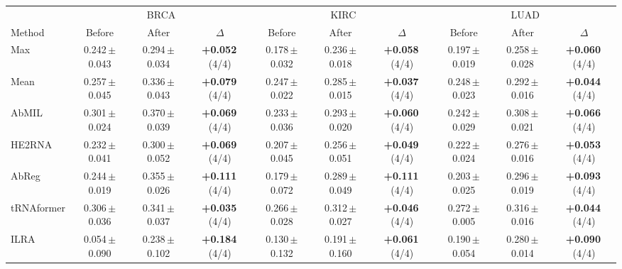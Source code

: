 \begin{tabular}{lccccccccc}
\toprule
& \multicolumn{3}{c}{BRCA} & \multicolumn{3}{c}{KIRC} & \multicolumn{3}{c}{LUAD}\\
\cmidrule(lr){2-4}\cmidrule(lr){5-7}\cmidrule(lr){8-10}
Method & Before & After & $\Delta$ & Before & After & $\Delta$ & Before & After & $\Delta$\\
\midrule
Max & 0.242\,{\tiny$\pm$0.043} & 0.294\,{\tiny$\pm$0.034} & \textbf{+0.052}\,{\tiny(4/4)} & 0.178\,{\tiny$\pm$0.032} & 0.236\,{\tiny$\pm$0.018} & \textbf{+0.058}\,{\tiny(4/4)} & 0.197\,{\tiny$\pm$0.019} & 0.258\,{\tiny$\pm$0.028} & \textbf{+0.060}\,{\tiny(4/4)}\\
Mean & 0.257\,{\tiny$\pm$0.045} & 0.336\,{\tiny$\pm$0.043} & \textbf{+0.079}\,{\tiny(4/4)} & 0.247\,{\tiny$\pm$0.022} & 0.285\,{\tiny$\pm$0.015} & \textbf{+0.037}\,{\tiny(4/4)} & 0.248\,{\tiny$\pm$0.023} & 0.292\,{\tiny$\pm$0.016} & \textbf{+0.044}\,{\tiny(4/4)}\\
AbMIL & 0.301\,{\tiny$\pm$0.024} & 0.370\,{\tiny$\pm$0.039} & \textbf{+0.069}\,{\tiny(4/4)} & 0.233\,{\tiny$\pm$0.036} & 0.293\,{\tiny$\pm$0.020} & \textbf{+0.060}\,{\tiny(4/4)} & 0.242\,{\tiny$\pm$0.029} & 0.308\,{\tiny$\pm$0.021} & \textbf{+0.066}\,{\tiny(4/4)}\\
HE2RNA & 0.232\,{\tiny$\pm$0.041} & 0.300\,{\tiny$\pm$0.052} & \textbf{+0.069}\,{\tiny(4/4)} & 0.207\,{\tiny$\pm$0.045} & 0.256\,{\tiny$\pm$0.051} & \textbf{+0.049}\,{\tiny(4/4)} & 0.222\,{\tiny$\pm$0.024} & 0.276\,{\tiny$\pm$0.016} & \textbf{+0.053}\,{\tiny(4/4)}\\
AbReg & 0.244\,{\tiny$\pm$0.019} & 0.355\,{\tiny$\pm$0.026} & \textbf{+0.111}\,{\tiny(4/4)} & 0.179\,{\tiny$\pm$0.072} & 0.289\,{\tiny$\pm$0.049} & \textbf{+0.111}\,{\tiny(4/4)} & 0.203\,{\tiny$\pm$0.025} & 0.296\,{\tiny$\pm$0.019} & \textbf{+0.093}\,{\tiny(4/4)}\\
tRNAformer & 0.306\,{\tiny$\pm$0.036} & 0.341\,{\tiny$\pm$0.037} & \textbf{+0.035}\,{\tiny(4/4)} & 0.266\,{\tiny$\pm$0.028} & 0.312\,{\tiny$\pm$0.027} & \textbf{+0.046}\,{\tiny(4/4)} & 0.272\,{\tiny$\pm$0.005} & 0.316\,{\tiny$\pm$0.016} & \textbf{+0.044}\,{\tiny(4/4)}\\
ILRA & 0.054\,{\tiny$\pm$0.090} & 0.238\,{\tiny$\pm$0.102} & \textbf{+0.184}\,{\tiny(4/4)} & 0.130\,{\tiny$\pm$0.132} & 0.191\,{\tiny$\pm$0.160} & \textbf{+0.061}\,{\tiny(4/4)} & 0.190\,{\tiny$\pm$0.054} & 0.280\,{\tiny$\pm$0.014} & \textbf{+0.090}\,{\tiny(4/4)}\\

\end{tabular}
